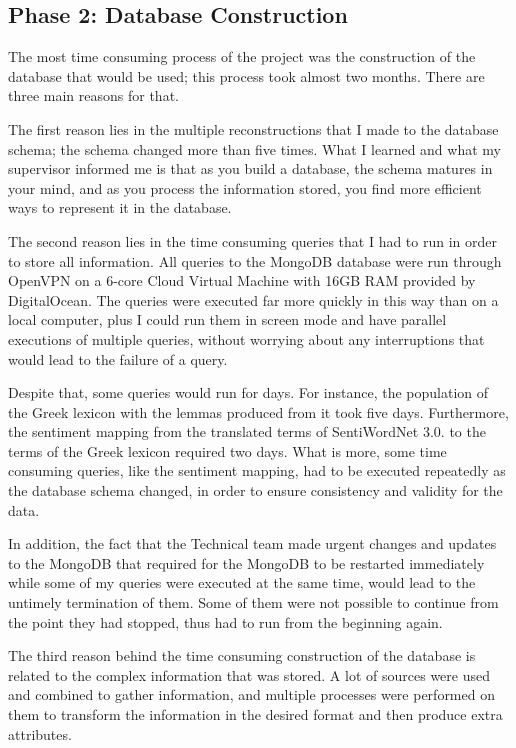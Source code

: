 \subsection{Phase 2: Database Construction}
\label{subsec:database}

The most time consuming process of the project
was the construction of the database that would be used;
this process took almost two months.
There are three main reasons for that.

The first reason lies in the multiple reconstructions
that I made to the database schema;
the schema changed more than five times.
What I learned and what my supervisor informed me is
that as you build a database,
the schema matures in your mind,
and as you process the information stored,
you find more efficient ways to represent it in the database.

The second reason lies in the time consuming queries
that I had to run in order to store all information.
All queries to the MongoDB database were run through OpenVPN
on a 6-core Cloud Virtual Machine with 16GB RAM
provided by DigitalOcean.
The queries were executed far more quickly in this way
than on a local computer, plus I could run them
in screen mode and have parallel executions of multiple queries,
without worrying about any interruptions
that would lead to the failure of a query.

Despite that, some queries would run for days.
For instance, the population of the Greek lexicon with the lemmas
produced from it took five days.
Furthermore, the sentiment mapping from the translated terms
of SentiWordNet 3.0. to the terms of the Greek lexicon
required two days.
What is more, some time consuming queries, like the sentiment mapping,
had to be executed repeatedly as the database schema changed,
in order to ensure consistency and validity for the data.

In addition,
the fact that the Technical team made urgent changes and updates
to the MongoDB that required for the MongoDB to be restarted immediately
while some of my queries were executed at the same time,
would lead to the untimely termination of them.
Some of them were not possible to continue
from the point they had stopped,
thus had to run from the beginning again.

The third reason behind the time consuming construction of the database
is related to the complex information that was stored.
A lot of sources were used and combined to gather information,
and multiple processes were performed on them
to transform the information in the desired format
and then produce extra attributes.


